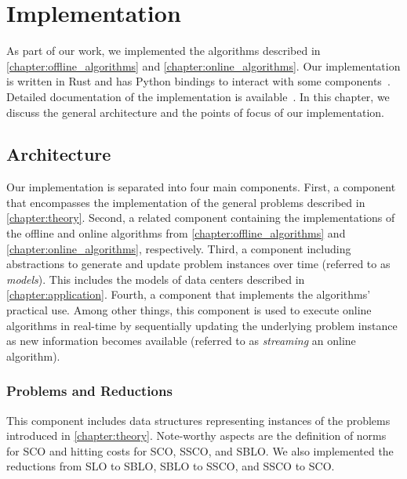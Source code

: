 
\chapter{Implementation}\label{chapter:implementation}

As part of our work, we implemented the algorithms described in \cref{chapter:offline_algorithms} and \cref{chapter:online_algorithms}. Our implementation is written in Rust and has Python bindings to interact with some components~\cite{Huebotter2021_2, Huebotter2021_3}. Detailed documentation of the implementation is available~\cite{Huebotter2021_4}. In this chapter, we discuss the general architecture and the points of focus of our implementation.

\section{Architecture}\label{section:implementation:architecture}

Our implementation is separated into four main components. First, a component that encompasses the implementation of the general problems described in \cref{chapter:theory}. Second, a related component containing the implementations of the offline and online algorithms from \cref{chapter:offline_algorithms} and \cref{chapter:online_algorithms}, respectively. Third, a component including abstractions to generate and update problem instances over time (referred to as \emph{models}). This includes the models of data centers described in \cref{chapter:application}. Fourth, a component that implements the algorithms' practical use. Among other things, this component is used to execute online algorithms in real-time by sequentially updating the underlying problem instance as new information becomes available (referred to as \emph{streaming} an online algorithm).

\subsection{Problems and Reductions}

This component includes data structures representing instances of the problems introduced in \cref{chapter:theory}. Note-worthy aspects are the definition of norms for SCO and hitting costs for SCO, SSCO, and SBLO. We also implemented the reductions from SLO to SBLO, SBLO to SSCO, and SSCO to SCO.

